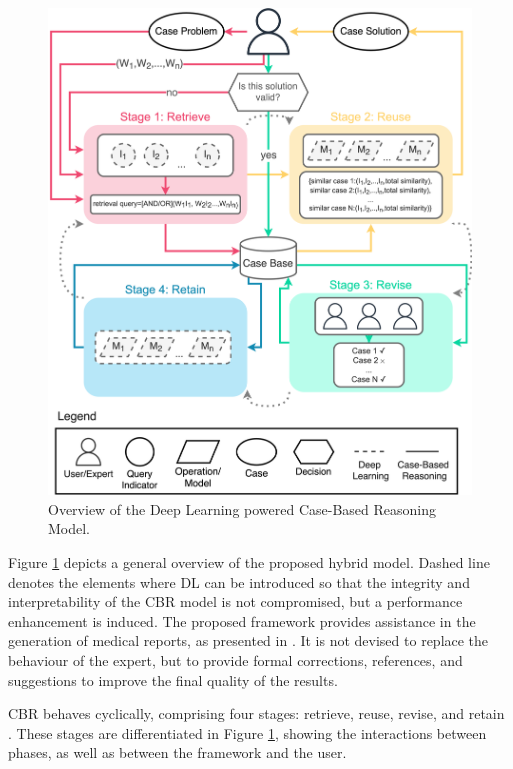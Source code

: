 \begin{figure}[t]
    \centering
    \includegraphics[width=.8\linewidth]{5_dlintegrationkbs/figures/Overview_CBR_DL.eps}
    \caption{Overview of the Deep Learning powered Case-Based Reasoning Model.}
    \label{fig:overview_CBR_DL}
\end{figure}

Figure \ref{fig:overview_CBR_DL} depicts a general overview of the proposed hybrid model. Dashed line denotes the elements where DL can be introduced so that the integrity and interpretability of the CBR model is not compromised, but a performance enhancement is induced. The proposed framework provides assistance in the generation of medical reports, as presented in \cite{DBLP:journals/ijimai/Amador-Dominguez21}. It is not devised to replace the behaviour of the expert, but to provide formal corrections, references, and suggestions to improve the final quality of the results. 

CBR behaves cyclically, comprising four stages: retrieve, reuse, revise, and retain \citep{overview_cbr}. These stages are differentiated in Figure \ref{fig:overview_CBR_DL}, showing the interactions between phases, as well as between the framework and the user. 

